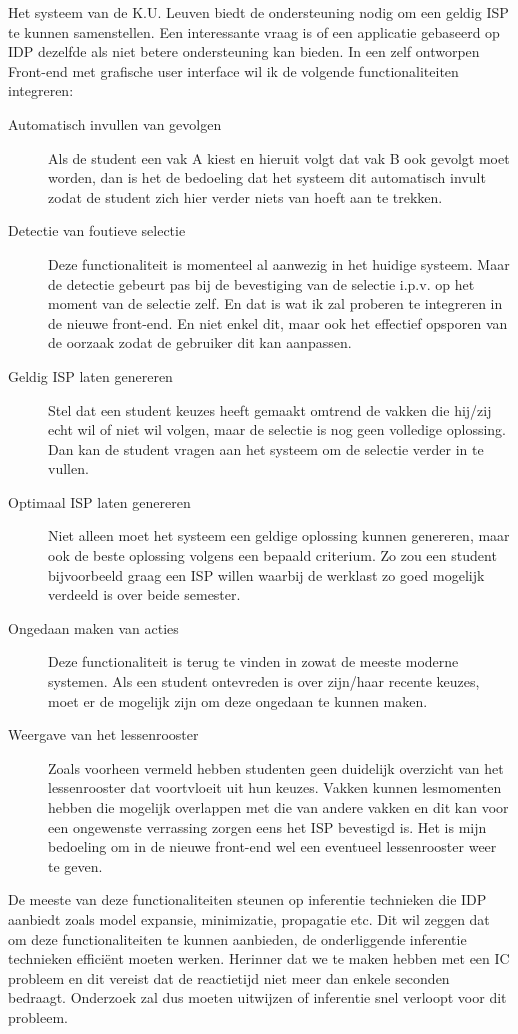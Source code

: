 Het systeem van de K.U. Leuven biedt de ondersteuning nodig om een geldig ISP te kunnen samenstellen. Een interessante vraag is of een applicatie gebaseerd op IDP dezelfde als niet betere ondersteuning kan bieden. In een zelf ontworpen Front-end met grafische user interface wil ik de volgende functionaliteiten integreren:
\begin{description}
\item[Automatisch invullen van gevolgen] Als de student een vak A kiest en hieruit volgt dat vak B ook gevolgt moet worden, dan is het de bedoeling dat het systeem dit automatisch invult zodat de student zich hier verder niets van hoeft aan te trekken. 
\item[Detectie van foutieve selectie] Deze functionaliteit is momenteel al aanwezig in het huidige systeem. Maar de detectie gebeurt pas bij de bevestiging van de selectie i.p.v. op het moment van de selectie zelf. En dat is wat ik zal proberen te integreren in de nieuwe front-end. En niet enkel dit, maar ook het effectief opsporen van de oorzaak zodat de gebruiker dit kan aanpassen.
\item[Geldig ISP laten genereren] Stel dat een student keuzes heeft gemaakt omtrend de vakken die hij/zij echt wil of niet wil volgen, maar de selectie is nog geen volledige oplossing. Dan kan de student vragen aan het systeem om de selectie verder in te vullen.
\item[Optimaal ISP laten genereren] Niet alleen moet het systeem een geldige oplossing kunnen genereren, maar ook de beste oplossing volgens een bepaald criterium. Zo zou een student bijvoorbeeld graag een ISP willen waarbij de werklast zo goed mogelijk verdeeld is over beide semester. 
\item[Ongedaan maken van acties] Deze functionaliteit is terug te vinden in zowat de meeste moderne systemen. Als een student ontevreden is over zijn/haar recente keuzes, moet er de mogelijk zijn om deze ongedaan te kunnen maken. 
\item[Weergave van het lessenrooster] Zoals voorheen vermeld hebben studenten geen duidelijk overzicht van het lessenrooster dat voortvloeit uit hun keuzes. Vakken kunnen lesmomenten hebben die mogelijk overlappen met die van andere vakken en dit kan voor een ongewenste verrassing zorgen eens het ISP bevestigd is. Het is mijn bedoeling om in de nieuwe front-end wel een eventueel lessenrooster weer te geven.
\end{description}
De meeste van deze functionaliteiten steunen op inferentie technieken die IDP aanbiedt zoals model expansie, minimizatie, propagatie etc. Dit wil zeggen dat om deze functionaliteiten te kunnen aanbieden, de onderliggende inferentie technieken effici\"{e}nt moeten werken. Herinner dat we te maken hebben met een IC probleem en dit vereist dat de reactietijd niet meer dan enkele seconden bedraagt. Onderzoek zal dus moeten uitwijzen of inferentie snel verloopt voor dit probleem.

